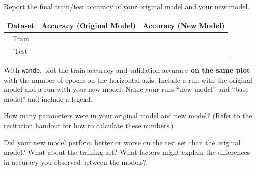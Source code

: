 \documentclass[11pt,addpoints,answers]{exam}
\begin{document}
\begin{questions}
\begin{parts}
\begin{subparts}

    \subpart[1] Report the final train/test accuracy of your original model and your new model.

        \begin{answer_box}[title=,height=3cm, width=14cm]
        \begin{center}
            \begin{tabular}{ccc}
                \toprule
                Dataset  & Accuracy (Original Model) & Accuracy (New Model) \\
                \midrule
                Train  & & \\
                Test  & & \\
                \bottomrule
            \end{tabular}

        \end{center}
        
        \end{answer_box}
        
    \subpart[4] With \lstinline{wandb}, plot the train accuracy and validation accuracy \textbf{on the same plot} with the number of epochs on the horizontal axis. Include a run with the original model and a run with your new model. Name your runs ``new-model'' and ``base-model'' and include a legend. 
        
        \begin{answer_box}[title=,height=9cm, width=15cm]
        \end{answer_box}

    \subpart[2] How many parameters were in your original model and new model? (Refer to the recitation handout for how to calculate these numbers.)

        \begin{answer_box}[title=Original model,height=2cm, width=4cm]
        \end{answer_box}
        
        \begin{answer_box}[title=New model,height=2cm, width=4cm]
        \end{answer_box}

\clearpage

    \subpart[2] Did your new model perform better or worse on the test set than the original model? What about the training set? What factors might explain the differences in accuracy you observed between the models?


\end{subparts}
\end{parts}
\end{questions}
\end{document}
